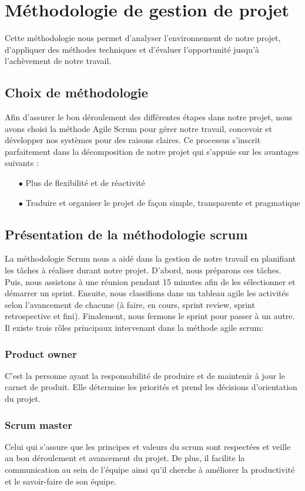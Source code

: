 \section[Methodologie]{Méthodologie de gestion de projet }
Cette méthodologie nous permet d'analyser l'environnement de notre projet, d'appliquer des méthodes techniques et d'évaluer l'opportunité jusqu'à l'achèvement de notre travail.
\subsection{Choix de méthodologie }
Afin d'assurer le bon déroulement des différentes étapes dans notre projet, nous avons choisi la méthode Agile Scrum pour gérer notre travail, concevoir et développer nos systèmes pour des raisons claires. Ce processus  s'inscrit parfaitement dans la décomposition de notre projet qui s'appuie sur les avantages suivants :
\begin{itemize}
	\item[$\bullet$] Plus de flexibilité et de réactivité
	\item[$\bullet$] Traduire et organiser le projet de façon simple, transparente et pragmatique
\end{itemize}

\subsection{Présentation de la méthodologie scrum }
La méthodologie Scrum nous a aidé dans la gestion de notre travail en planifiant les tâches à réaliser durant notre projet. D'abord, nous préparons ces tâches. Puis, nous assistons à une réunion pendant 15 minutes afin de les sélectionner et démarrer un sprint. Ensuite, nous classifions dans un tableau agile les activités selon l'avancement de chacune (à faire, en cours, sprint review, sprint retrospective et fini). Finalement, nous fermons le sprint pour passer à un autre.
Il existe trois rôles principaux intervenant dans la méthode agile scrum:
\subsubsection{Product owner }
C'est la personne ayant la responsabilité de produire et de maintenir à jour le carnet de produit. Elle détermine les priorités et prend les décisions d'orientation du projet.
\subsubsection{Scrum master  }
Celui qui s’assure que les principes et valeurs du scrum sont
respectées et veille au bon déroulement et avancement du projet. De plus, il facilite la communication au sein de l’équipe ainsi qu'il cherche à améliorer la productivité et le savoir-faire de son équipe.
